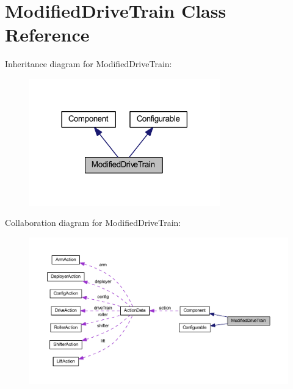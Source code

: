 \hypertarget{class_modified_drive_train}{
\section{\-Modified\-Drive\-Train \-Class \-Reference}
\label{class_modified_drive_train}
}


\-Inheritance diagram for \-Modified\-Drive\-Train\-:\nopagebreak
\begin{figure}[H]
\begin{center}
\leavevmode
\includegraphics[width=234pt]{class_modified_drive_train__inherit__graph}
\end{center}
\end{figure}


\-Collaboration diagram for \-Modified\-Drive\-Train\-:\nopagebreak
\begin{figure}[H]
\begin{center}
\leavevmode
\includegraphics[width=350pt]{class_modified_drive_train__coll__graph}
\end{center}
\end{figure}
